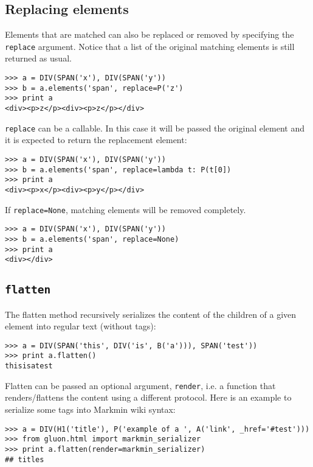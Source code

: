 \documentclass[justified,sixbynine,notoc]{tufte-book}
\def\ft{\small\tt}
\def\inxx#1{\index{#1}}
\begin{document}
\begin{fullwidth}
\goodbreak\subsection{Replacing elements}

Elements that are matched can also be replaced or removed by specifying
the {\ft replace} argument. Notice that a
list of the original matching elements is still returned as usual.

\begin{lstlisting}
>>> a = DIV(SPAN('x'), DIV(SPAN('y'))
>>> b = a.elements('span', replace=P('z')
>>> print a
<div><p>z</p><div><p>z</p></div>
\end{lstlisting}

{\ft replace} can be a callable. In this case it will be passed
the original element and it is expected to return the replacement element:

\begin{lstlisting}
>>> a = DIV(SPAN('x'), DIV(SPAN('y'))
>>> b = a.elements('span', replace=lambda t: P(t[0])
>>> print a
<div><p>x</p><div><p>y</p></div>
\end{lstlisting}

If {\ft replace=None}, matching elements will be removed completely.

\begin{lstlisting}
>>> a = DIV(SPAN('x'), DIV(SPAN('y'))
>>> b = a.elements('span', replace=None)
>>> print a
<div></div>
\end{lstlisting}

\goodbreak\subsection{{\ft flatten} \inxx{flatten}}

The flatten method recursively serializes the content of the children of a given element into regular text (without tags):
\begin{lstlisting}
>>> a = DIV(SPAN('this', DIV('is', B('a'))), SPAN('test'))
>>> print a.flatten()
thisisatest
\end{lstlisting}

Flatten can be passed an optional argument, {\ft render}, i.e. a function that renders/flattens the content using a different protocol. Here is an example to serialize some tags into Markmin wiki syntax:
\begin{lstlisting}
>>> a = DIV(H1('title'), P('example of a ', A('link', _href='#test')))
>>> from gluon.html import markmin_serializer
>>> print a.flatten(render=markmin_serializer)
## titles


\end{lstlisting}
\end{fullwidth}
\end{document}
